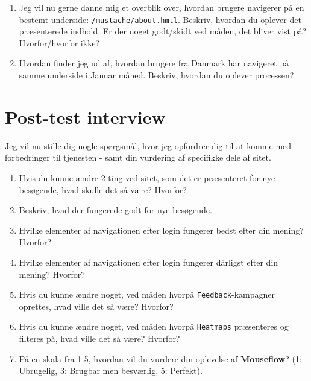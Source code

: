 \documentclass{article}
\begin{document}
\begin{enumerate}
\item Jeg vil nu gerne danne mig et overblik over, hvordan brugere navigerer på en bestemt underside: \texttt{/mustache/about.hmtl}. Beskriv, hvordan du oplever det præsenterede indhold. Er der noget godt/skidt ved måden, det bliver vist på? Hvorfor/hvorfor ikke?
\item Hvordan finder jeg ud af, hvordan brugere fra Danmark har navigeret på samme underside i Januar måned. Beskriv, hvordan du oplever processen?  
\end{enumerate}

\section*{Post-test interview}

Jeg vil nu stille dig nogle spørgsmål, hvor jeg opfordrer dig til at komme med forbedringer til tjenesten - samt din vurdering af specifikke dele af sitet.

\begin{enumerate}

\item Hvis du kunne ændre 2 ting ved sitet, som det er præsenteret for nye besøgende, hvad skulle det så være? Hvorfor?
\item Beskriv, hvad der fungerede godt for nye besøgende.
\item Hvilke elementer af navigationen efter login fungerer bedst efter din mening? Hvorfor? 
\item Hvilke elementer af navigationen efter login fungerer dårligst efter din mening? Hvorfor?
\item Hvis du kunne ændre noget, ved måden hvorpå \texttt{Feedback}-kampagner oprettes, hvad ville det så være? Hvorfor?
\item Hvis du kunne ændre noget, ved måden hvorpå \texttt{Heatmaps} præsenteres og filteres på, hvad ville det så være? Hvorfor?
\item På en skala fra 1-5, hvordan vil du vurdere din oplevelse af \textbf{Mouseflow}? (1: Ubrugelig, 3: Brugbar men besværlig, 5: Perfekt). 
\end{enumerate}
\end{document}
